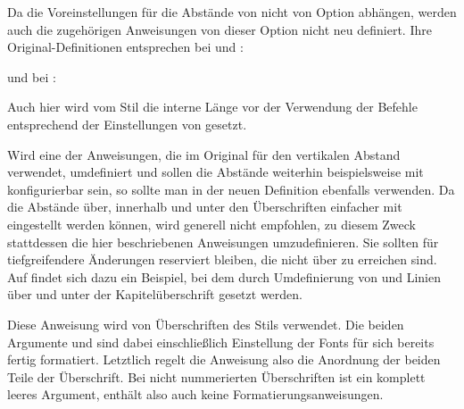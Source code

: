 Da die Voreinstellungen für die Abstände von  nicht
von Option  abhängen, werden auch die
zugehörigen Anweisungen von dieser Option nicht neu
definiert. Ihre Original-Definitionen entsprechen bei  und
:
\begin{lstcode}
  \newcommand*{\partheadstartvskip}{%
    \null\vskip-\baselineskip\vskip\@tempskipa
  }
  \newcommand*{\partheadmidvskip}{%
    \par\nobreak\vskip\@tempskipa
  }
  \newcommand*{\partheadendvskip}{%
    \vskip\@tempskipa\newpage
  }
\end{lstcode}
und bei :
\begin{lstcode}
  \newcommand*{\partheadstartvskip}{%
    \addvspace{\@tempskipa}%
  }
  \newcommand*{\partheadmidvskip}{%
    \par\nobreak
  }
  \newcommand*{\partheadendvskip}{%
    \vskip\@tempskipa
  }
\end{lstcode}
Auch hier wird vom Stil  die interne Länge
 vor der
Verwendung der Befehle entsprechend der Einstellungen von
gesetzt.

Wird eine der Anweisungen, die im Original  für den
vertikalen Abstand verwendet, umdefiniert und sollen die Abstände weiterhin
beispielsweise mit 
konfigurierbar sein, so sollte man in der neuen Definition ebenfalls
 verwenden. Da die Abstände über, innerhalb und
unter den Überschriften einfacher mit
 eingestellt werden können,
wird generell nicht empfohlen, zu diesem Zweck stattdessen die hier
beschriebenen Anweisungen umzudefinieren. Sie sollten für tiefgreifendere
Änderungen reserviert bleiben, die nicht über
 zu erreichen sind.
Auf \cite{wiki-de} findet sich dazu ein Beispiel, bei
dem durch Umdefinierung von  und
 Linien über und unter der Kapitelüberschrift
gesetzt werden.%
%
\EndIndexGroup


\begin{Declaration}
\end{Declaration}
Diese Anweisung wird von Überschriften des Stils
 verwendet. Die beiden
Argumente  und  sind dabei einschließlich
Einstellung der Fonts für sich bereits fertig formatiert. Letztlich regelt die
Anweisung also die Anordnung der beiden Teile der Überschrift. Bei nicht
nummerierten Überschriften ist  ein komplett leeres Argument,
enthält also auch keine Formatierungsanweisungen.

